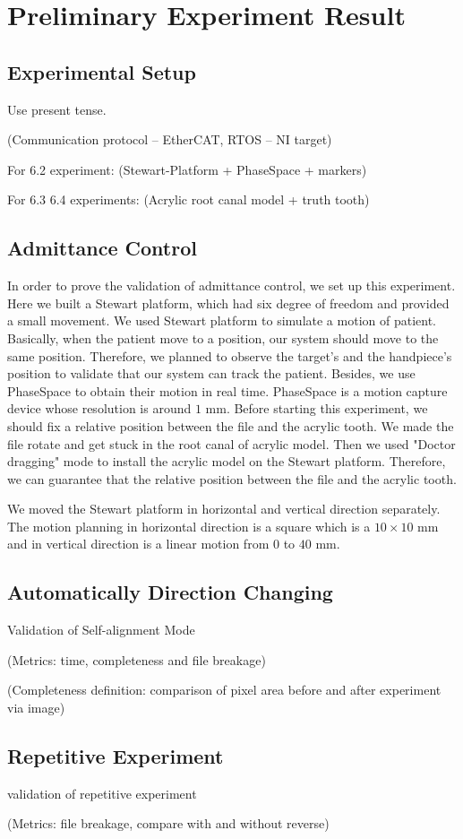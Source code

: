 \chapter{Preliminary Experiment Result}
\section{Experimental Setup}
Use present tense.\par\noindent
(Communication protocol – EtherCAT, RTOS – NI target)						
\par\noindent
For 6.2 experiment: (Stewart-Platform + PhaseSpace + markers)				
\par\noindent
For 6.3 6.4 experiments: (Acrylic root canal model + truth tooth)
\section{Admittance Control}
In order to prove the validation of admittance control, we set up this experiment. Here we built a Stewart platform, which had six degree of freedom and provided a small movement. We used Stewart platform to simulate a motion of patient. Basically, when the patient move to a position, our system should move to the same position. Therefore, we planned to observe the target's and the handpiece's position to validate that our system can track the patient. Besides, we use PhaseSpace to obtain their motion in real time. PhaseSpace is a motion capture device whose resolution is around $1$ mm. Before starting this experiment, we should fix a relative position between the file and the acrylic tooth. We made the file rotate and get stuck in the root canal of acrylic model. Then we used "Doctor dragging" mode to install the acrylic model on the Stewart platform. Therefore, we can guarantee that the relative position between the file and the acrylic tooth.
\par
We moved the Stewart platform in horizontal and vertical direction separately. The motion planning in horizontal direction is a square which is a $10\times 10$ mm and in vertical direction is a linear motion from $0$ to $40$ mm.
\section{Automatically Direction Changing}
Validation of Self-alignment Mode
\par\noindent
(Metrics: time, completeness and file breakage)								
\par\noindent
(Completeness definition: comparison of pixel area before and after experiment via image)
\section{Repetitive Experiment}
validation of repetitive experiment
\par\noindent
(Metrics: file breakage, compare with and without reverse)